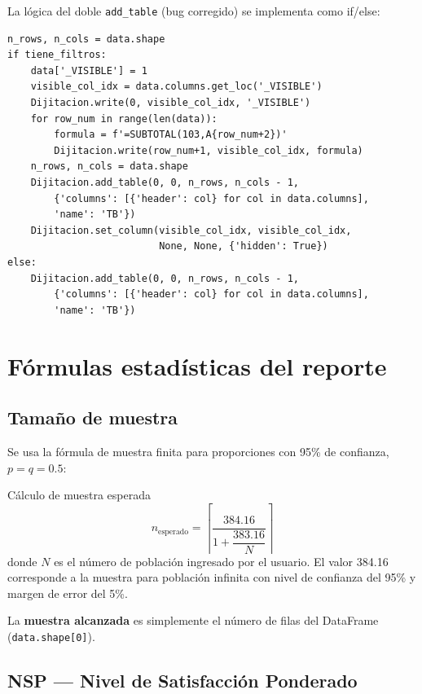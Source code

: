 \documentclass[12pt, letterpaper]{article}
\begin{document}
La lógica del doble \texttt{add\_table} (bug corregido) se implementa como if/else:

\begin{lstlisting}[caption={Creación condicional de la tabla TB}]
n_rows, n_cols = data.shape
if tiene_filtros:
    data['_VISIBLE'] = 1
    visible_col_idx = data.columns.get_loc('_VISIBLE')
    Dijitacion.write(0, visible_col_idx, '_VISIBLE')
    for row_num in range(len(data)):
        formula = f'=SUBTOTAL(103,A{row_num+2})'
        Dijitacion.write(row_num+1, visible_col_idx, formula)
    n_rows, n_cols = data.shape
    Dijitacion.add_table(0, 0, n_rows, n_cols - 1,
        {'columns': [{'header': col} for col in data.columns],
        'name': 'TB'})
    Dijitacion.set_column(visible_col_idx, visible_col_idx,
                          None, None, {'hidden': True})
else:
    Dijitacion.add_table(0, 0, n_rows, n_cols - 1,
        {'columns': [{'header': col} for col in data.columns],
        'name': 'TB'})
\end{lstlisting}

\section{Fórmulas estadísticas del reporte}

\subsection{Tamaño de muestra}

Se usa la fórmula de muestra finita para proporciones con 95\% de confianza, $p = q = 0.5$:

\begin{formulabox}{Cálculo de muestra esperada}
\[
n_{\text{esperado}} = \left\lceil \frac{384.16}{1 + \dfrac{383.16}{N}} \right\rceil
\]
donde $N$ es el número de población ingresado por el usuario. El valor 384.16 corresponde a la muestra para población infinita con nivel de confianza del 95\% y margen de error del 5\%.
\end{formulabox}

La \textbf{muestra alcanzada} es simplemente el número de filas del DataFrame (\texttt{data.shape[0]}).

\subsection{NSP — Nivel de Satisfacción Ponderado}
\end{document}
